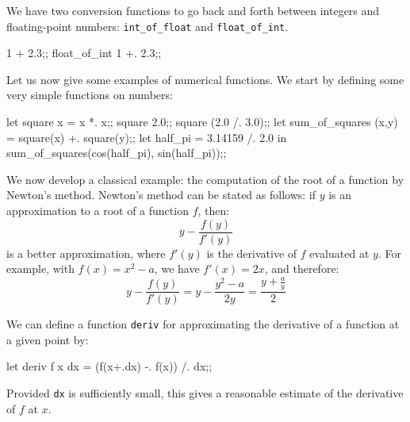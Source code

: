 We have two conversion functions to go back and forth between integers
and floating-point numbers: \verb"int_of_float" and
\verb"float_of_int".

\begin{caml_example}
1 + 2.3;;
float_of_int 1 +. 2.3;;
\end{caml_example}

Let us now give some examples of numerical functions. We start by
defining some very simple functions on numbers: 
\begin{caml_example}
let square x = x *. x;;
square 2.0;;
square (2.0 /. 3.0);;
let sum_of_squares (x,y) = square(x) +. square(y);;
let half_pi = 3.14159 /. 2.0
in sum_of_squares(cos(half_pi), sin(half_pi));;
\end{caml_example}

We now develop a classical example: the computation of the root of a
function by Newton's method.
Newton's method can be stated as follows: if $y$ is an approximation to a
root of a function $f$, then:
\[
y - \frac{f(y)}{f'(y)}
\]
is a better approximation, where $f'(y)$ is the derivative of $f$
evaluated at $y$.
For example, with $f(x)=x^2 -a$, we have $f'(x)=2x$, and therefore:
\[
y-\frac{f(y)}{f'(y)} = y - \frac{y^2 -a}{2y} = \frac{y+\frac{a}{y}}{2}
\]

We can define a function {\tt deriv} for approximating the derivative of a
function at a given point by:
\begin{caml_example}
let deriv f x dx = (f(x+.dx) -. f(x)) /. dx;;
\end{caml_example}
Provided \verb|dx| is sufficiently small, this gives a reasonable estimate
of the derivative of $f$ at $x$.

